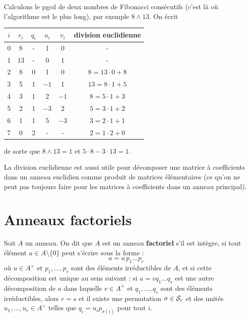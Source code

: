 \documentclass[]{report}
\begin{document}
\begin{ex}{}{}
    Calculons le pgcd de deux nombres de Fibonacci consécutifs (c'est là où l'algorithme est le plus long), par exemple $8 \wedge 13$. On écrit
    \begin{center}
    \begin{tabular}{c|c|c|c|c|c}
        $i$ & $r_i$ & $q_i$ & $u_i$ & $v_i$ & division euclidienne \\
        \hline
        0 & 8 & - & 1 & 0 & - \\
        1 & 13 & - & 0 & 1 & - \\
        2 & 8 & 0 & 1 & 0 & $8 = 13 \cdot 0 + 8$ \\
        3 & 5 & 1 & $-1$ & 1 & $13 = 8 \cdot 1 + 5$ \\
        4 & 3 & 1 & 2 & $-1$ & $8 = 5 \cdot 1 + 3$ \\
        5 & 2 & 1 & $-3$ & 2 & $5 = 3 \cdot 1 + 2$ \\
        6 & 1 & 1 & 5 & $-3$ & $3 = 2 \cdot 1 + 1$ \\
        7 & 0 & 2 & - & - & $2 = 1 \cdot 2 + 0$
    \end{tabular}
    \end{center}
    de sorte que $8 \wedge 13 = 1$ et $5 \cdot 8 - 3 \cdot 13 = 1$.
\end{ex}

\begin{re}{}{}
    La division euclidienne est aussi utile pour décomposer une matrice à coefficients dans un anneau euclidien comme produit de matrices élémentaires (ce qu'on ne peut pas toujours faire pour les matrices à coefficients dans un anneau principal).
\end{re}

\section{Anneaux factoriels}

\begin{df}{}{}
    Soit $A$ un anneau. On dit que $A$ est un anneau \textbf{factoriel} s'il est intègre, si tout élément $a \in A \setminus \{0\}$ peut s'écrire sous la forme :
    \[a = u \, p_1 \dots p_r \tag{1.3}\]
    où $u \in A^{\times}$ et $p_1, \ldots, p_r$ sont des éléments irréductibles de $A$, et si cette décomposition est unique au sens suivant : si $a = vq_1 \ldots q_s$ est une autre décomposition de $a$ dans laquelle $v \in A^{\times}$ et $q_1, \ldots, q_s$ sont des éléments irréductibles, alors $r = s$ et il existe une permutation $\sigma \in \mathcal{S}_r$ et des unités $u_1, \ldots, u_r \in A^{\times}$ telles que $q_i = u_i p_{\sigma(i)}$ pour tout $i$.
\end{df}
\end{document}
